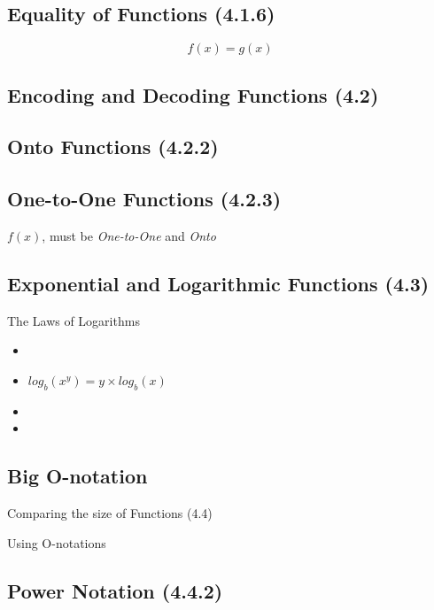 \documentclass[]{report}
\begin{document}
\subsection*{Equality of Functions (4.1.6)}
\[f(x) = g(x) \]


\subsection*{Encoding and Decoding Functions (4.2)}


\subsection*{Onto Functions (4.2.2)}

\subsection*{One-to-One Functions (4.2.3)}
$f(x)$, must be \emph{One-to-One} and \emph{Onto}



\subsection*{Exponential and Logarithmic Functions (4.3)}

The Laws of Logarithms
\begin{itemize}
\item
\item $log_b(x^y) = y \times log_b(x)$
\item
\item
\end{itemize}

\subsection*{Big O-notation}
Comparing the size of Functions (4.4)


Using O-notations

\subsection*{Power Notation (4.4.2)}



\end{document}
